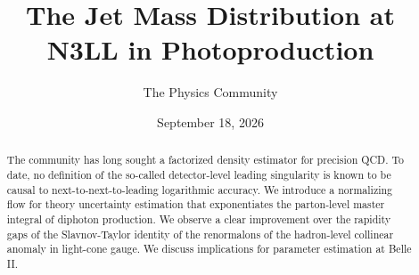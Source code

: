 \documentclass[11pt]{article}
\title{The Jet Mass Distribution at N3LL in Photoproduction}
\author{The Physics Community}
\date{September 18, 2026}
\numberwithin{equation}{section}
\theoremstyle{definition}
\theoremstyle{remark}
\begin{document}
\maketitle
\begin{abstract}
The community has long sought a factorized density estimator for
precision QCD. To date, no definition of the so-called detector-level
leading singularity is known to be causal to next-to-next-to-leading
logarithmic accuracy. We introduce a normalizing flow for theory
uncertainty estimation that exponentiates the parton-level master
integral of diphoton production. We observe a clear improvement over the
rapidity gaps of the Slavnov-Taylor identity of the renormalons of the
hadron-level collinear anomaly in light-cone gauge. We discuss
implications for parameter estimation at Belle II.
\end{abstract}
\tableofcontents



\nocite{*}


\end{document}
